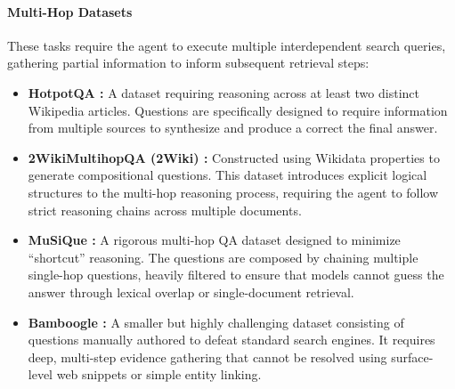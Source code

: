\documentclass{article} %
\begin{document}
\paragraph{Multi-Hop Datasets} These tasks require the agent to execute multiple interdependent search queries, gathering partial information to inform subsequent retrieval steps:
\begin{itemize}[leftmargin=1.2em]
    \item \textbf{HotpotQA \citep{hotpotqa}:} A dataset requiring reasoning across at least two distinct Wikipedia articles. Questions are specifically designed to require information from multiple sources to synthesize and produce a correct the final answer.
    \item \textbf{2WikiMultihopQA (2Wiki) \citep{2wiki}:} Constructed using Wikidata properties to generate compositional questions. This dataset introduces explicit logical structures to the multi-hop reasoning process, requiring the agent to follow strict reasoning chains across multiple documents.
    \item \textbf{MuSiQue \citep{musique}:} A rigorous multi-hop QA dataset designed to minimize ``shortcut'' reasoning. The questions are composed by chaining multiple single-hop questions, heavily filtered to ensure that models cannot guess the answer through lexical overlap or single-document retrieval.
    \item \textbf{Bamboogle \citep{bamboogle}:} A smaller but highly challenging dataset consisting of questions manually authored to defeat standard search engines. It requires deep, multi-step evidence gathering that cannot be resolved using surface-level web snippets or simple entity linking.
\end{itemize}
\end{document}
